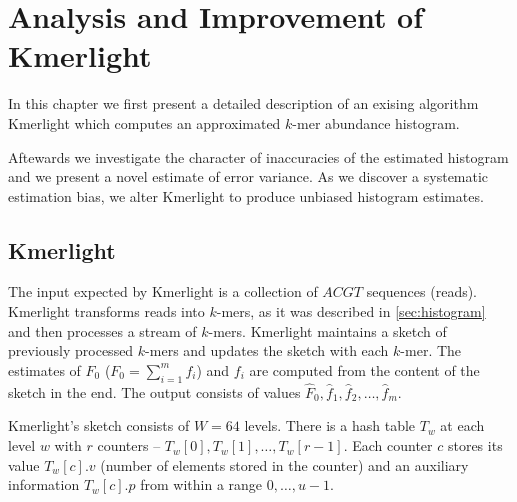 \chapter{Analysis and Improvement of Kmerlight}
In this chapter we first present a detailed description of an exising algorithm Kmerlight \cite{Sivadasan2016}
which computes an approximated $k$-mer abundance histogram.

Aftewards we investigate the character of inaccuracies of the estimated histogram and we present a novel
estimate of error variance. As we discover a systematic estimation bias, we alter Kmerlight to produce
unbiased histogram estimates. 

\section{Kmerlight}
\label{sec:kmerlight}
The input expected by Kmerlight is a collection of $ACGT$ sequences (reads).
Kmerlight transforms reads into $k$-mers, as it was described in \ref{sec:histogram}
and then processes a stream of $k$-mers. Kmerlight maintains a sketch of previously
processed $k$-mers and updates the sketch with each $k$-mer. The estimates of $F_0$ ($F_0 = \sum_{i=1}^{m} f_i$)
and $f_i$ are computed from the content of the sketch in the end. The output consists
of values $\hat F_0, \hat f_1, \hat f_2, \dots, \hat f_m$.

Kmerlight's sketch consists of $W=64$ levels. There is a hash table $T_w$ at each level $w$ with $r$ counters -- $T_w[0], T_w[1], \dots, T_w[r-1]$.
Each counter $c$ stores its value $T_w[c].v$ (number of elements stored in the counter) and an auxiliary information $T_w[c].p$ from within a range
$0, \dots, u-1$.


